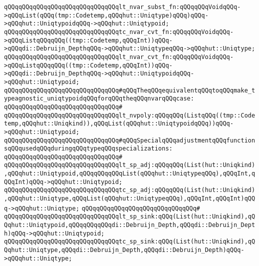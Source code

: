 \verb|qQQqqQQqqQQqqQQqqQQqqQQqqQQqqQQqlt_nvar_subst_fn:qQQqqQQqVoidqQQq->qQQqList(qQQq(tmp::Codetemp,qQQqhut::Uniqtype)qQQq)qQQq->qQQqhut::UniqtypoidqQQq->qQQqhut::Uniqtypoid;|\newline
\newline
\verb|qQQqqQQqqQQqqQQqqQQqqQQqqQQqqQQqtc_nvar_cvt_fn:qQQqqQQqVoidqQQq->qQQqListqQQqqQQq((tmp::Codetemp,qQQqInt))qQQq->qQQqdi::Debruijn_DepthqQQq->qQQqhut::UniqtypeqQQq->qQQqhut::Uniqtype;|\newline
\newline
\verb|qQQqqQQqqQQqqQQqqQQqqQQqqQQqqQQqlt_nvar_cvt_fn:qQQqqQQqVoidqQQq->qQQqListqQQqqQQq((tmp::Codetemp,qQQqInt))qQQq->qQQqdi::Debruijn_DepthqQQq->qQQqhut::UniqtypoidqQQq->qQQqhut::Uniqtypoid;|\newline
\newline
\verb|qQQqqQQqqQQqqQQqqQQqqQQqqQQqqQQq#qQQqTheqQQqequivalentqQQqtoqQQqmake_typeagnostic_uniqtypoidqQQqforqQQqtheqQQqnvarqQQqcase:|\newline
\verb|qQQqqQQqqQQqqQQqqQQqqQQqqQQqqQQq#|\newline
\verb|qQQqqQQqqQQqqQQqqQQqqQQqqQQqqQQqlt_nvpoly:qQQqqQQq(ListqQQq((tmp::Codetemp,qQQqhut::Uniqkind)),qQQqList(qQQqhut::UniqtypoidqQQq))qQQq->qQQqhut::Uniqtypoid;|\newline
\newline
\verb|qQQqqQQqqQQqqQQqqQQqqQQqqQQqqQQq#qQQqSpecialqQQqadjustmentqQQqfunctionsqQQqusedqQQqduringqQQqtypeqQQqspecializations:|\newline
\verb|qQQqqQQqqQQqqQQqqQQqqQQqqQQqqQQq#|\newline
\verb|qQQqqQQqqQQqqQQqqQQqqQQqqQQqqQQqlt_sp_adj:qQQqqQQq(List(hut::Uniqkind),qQQqhut::Uniqtypoid,qQQqqQQqqQQqList(qQQqhut::UniqtypeqQQq),qQQqInt,qQQqInt)qQQq->qQQqhut::Uniqtypoid;|\newline
\verb|qQQqqQQqqQQqqQQqqQQqqQQqqQQqqQQqtc_sp_adj:qQQqqQQq(List(hut::Uniqkind),qQQqhut::Uniqtype,qQQqList(qQQqhut::UniqtypeqQQq),qQQqInt,qQQqInt)qQQq->qQQqhut::Uniqtype;|\newline
\verb|qQQqqQQqqQQqqQQqqQQqqQQqqQQqqQQq#|\newline
\verb|qQQqqQQqqQQqqQQqqQQqqQQqqQQqqQQqlt_sp_sink:qQQq(List(hut::Uniqkind),qQQqhut::Uniqtypoid,qQQqqQQqqQQqdi::Debruijn_Depth,qQQqdi::Debruijn_Depth)qQQq->qQQqhut::Uniqtypoid;|\newline
\verb|qQQqqQQqqQQqqQQqqQQqqQQqqQQqqQQqtc_sp_sink:qQQq(List(hut::Uniqkind),qQQqhut::Uniqtype,qQQqdi::Debruijn_Depth,qQQqdi::Debruijn_Depth)qQQq->qQQqhut::Uniqtype;|\newline
